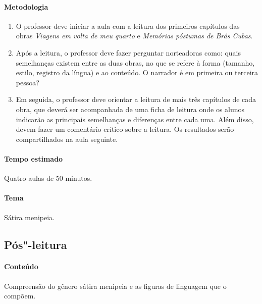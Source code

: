 \documentclass[12pt]{extarticle}
\begin{document}
\paragraph{Metodologia}
\begin{enumerate}
	\item
	O professor deve iniciar a aula com a leitura dos primeiros capítulos das obras
	\emph{Viagens em volta de meu quarto} e \emph{Memórias póstumas de Brás Cubas}.

	\item
	Após a leitura, o professor deve fazer perguntar norteadoras como:
	quais semelhanças existem entre as duas obras, no que se refere à forma
	(tamanho, estilo, registro da língua) e ao conteúdo. O narrador
	é em primeira ou terceira pessoa?
	\item
	Em seguida, o professor deve orientar a leitura de mais três capítulos de cada
	obra, que deverá ser acompanhada de uma ficha de leitura onde os alunos 
	indicarão as principais semelhanças e diferenças entre cada uma. 
	Além disso, devem fazer um comentário crítico sobre a leitura.	
	Os resultados serão compartilhados na aula seguinte. 

\end{enumerate}

\paragraph{Tempo estimado} Quatro aulas de 50 minutos.



\paragraph{Tema} Sátira menipeia.
\subsection{Pós"-leitura}


\paragraph{Conteúdo} Compreensão do gênero sátira menipeia e as figuras de linguagem
que o compõem.
\end{document}
